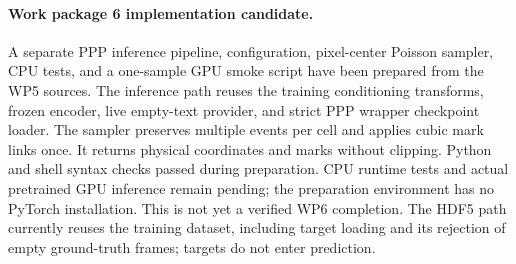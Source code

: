 \paragraph{Work package 6 implementation candidate.}
A separate PPP inference pipeline, configuration, pixel-center Poisson sampler,
CPU tests, and a one-sample GPU smoke script have been prepared from the WP5
sources. The inference path reuses the training conditioning transforms, frozen
encoder, live empty-text provider, and strict PPP wrapper checkpoint loader.
The sampler preserves multiple events per cell and applies cubic mark links
once. It returns physical coordinates and marks without clipping.
Python and shell syntax checks passed during preparation. CPU runtime tests
and actual pretrained GPU inference remain pending; the preparation environment
has no PyTorch installation. This is not yet a verified WP6 completion.
The HDF5 path currently reuses the training dataset, including target loading
and its rejection of empty ground-truth frames; targets do not enter prediction.

